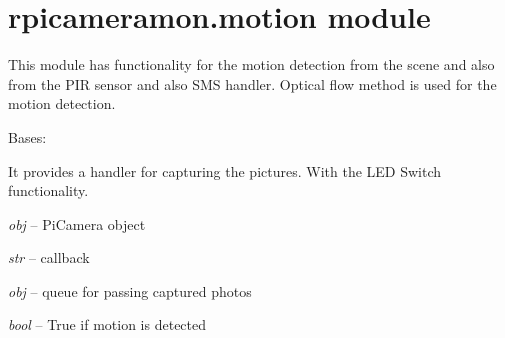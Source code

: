 \documentclass[letterpaper,10pt,english]{sphinxmanual}
\begin{document}
\chapter{rpicameramon.motion module}
\label{rpicameramon:rpicameramon-motion-module}
This module has functionality for the motion detection from the scene and also from the PIR sensor
and also SMS handler.
Optical flow method is used for the motion detection.
\label{rpicameramon:module-rpicameramon.motion}

\begin{fulllineitems}
\label{rpicameramon:rpicameramon.motion.CaptureHandler}
Bases: 

It provides a handler for capturing the pictures. With the LED Switch
functionality.

\begin{fulllineitems}
\label{rpicameramon:rpicameramon.motion.CaptureHandler.camera}
\emph{obj} -- PiCamera object

\end{fulllineitems}


\begin{fulllineitems}
\label{rpicameramon:rpicameramon.motion.CaptureHandler.callback}
\emph{str} -- callback

\end{fulllineitems}


\begin{fulllineitems}
\label{rpicameramon:rpicameramon.motion.CaptureHandler.q}
\emph{obj} -- queue for passing captured photos

\end{fulllineitems}


\begin{fulllineitems}
\label{rpicameramon:rpicameramon.motion.CaptureHandler.detected}
\emph{bool} -- True if motion is detected


\end{fulllineitems}
\end{fulllineitems}
\end{document}
